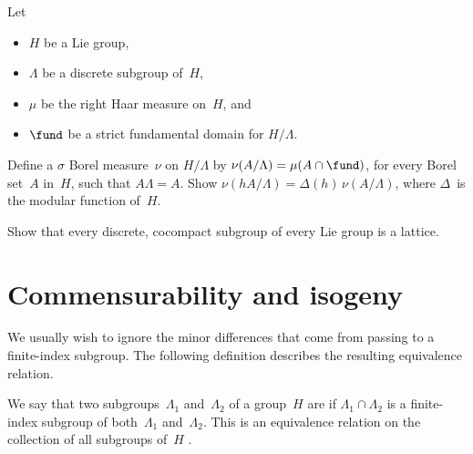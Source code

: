 \begin{exercises}
\item \label{SemiinvariantMeasure}
 Let 
 \begin{itemize}
 \item $H$ be a Lie group,
 \item $\Lambda$ be a discrete subgroup of~$H$,
 \item $\mu$ be the right Haar measure on~$H$,
 and
 \item $\fund$ be a strict fundamental domain for $H/\Lambda$. %
 \end{itemize}
 Define a $\sigma$ Borel measure~$\nu$ on $H/\Lambda$ by 
 $ \nu(A/\Lambda) = \mu( A \cap \fund) $,
 for every Borel set~$A$ in~$H$, such that $A \Lambda =
A$. Show $\nu(h A / \Lambda) =
\Delta(h) \, \nu(A/\Lambda)$, where $\Delta$~is
the modular function of~$H$.


\item Show that every discrete, cocompact subgroup of every Lie group is a lattice.

\end{exercises}





\section{Commensurability and isogeny} \label{CommSect}

We usually wish
to ignore the minor differences that come from passing to a finite-index
subgroup. The following
definition describes the resulting equivalence relation.

\begin{defn} \label{CommensDefn}
 We say that two subgroups~$\Lambda_1$ and~$\Lambda_2$ of a group~$H$ are
 if $\Lambda_1 \cap \Lambda_2$ is a
finite-index subgroup of both~$\Lambda_1$ and~$\Lambda_2$.
This is an equivalence relation on the collection of all
subgroups of~$H$ .
 \end{defn}

